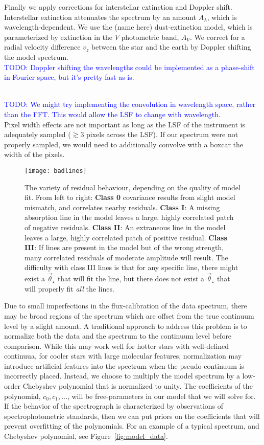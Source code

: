 \documentclass[preprint]{aastex} %
\newcommand{\vt}{\vec{\theta}}
\newcommand{\vstar}{\vt_{\star}}
\newcommand{\todo}[1]{ \textcolor{Blue}{\\TODO: #1}}
\begin{document}
Finally we apply corrections for interstellar extinction and Doppler shift. Interstellar extinction attenuates the spectrum by an amount $A_\lambda$, which is wavelength-dependent. We use the (name here) dust-extinction model, which is parameterized by extinction in the $V$ photometric band, $A_V$. We correct for a radial velocity difference $v_z$ between the star and the earth by Doppler shifting the model spectrum. 
\todo{Doppler shifting the wavelengths could be implemented as a phase-shift in Fourier space, but it's pretty fast as-is.}

\todo{We might try implementing the convolution in wavelength space, rather than the FFT. This would allow the LSF to change with wavelength.\\}
Pixel width effects are not important as long as the LSF of the instrument is adequately sampled ($\gtrsim 3$ pixels across the LSF). If our spectrum were not properly sampled, we would need to additionally convolve with a boxcar the width of the pixels.

\begin{figure*}[!htb]
\begin{center}
  \texttt{[image: badlines]}
  \caption{The variety of residual behaviour, depending on the quality of model fit. From left to right: \textbf{Class 0} covariance results from slight model mismatch, and correlates nearby residuals. \textbf{Class I}: A missing absorption line in the model leaves a large, highly correlated patch of negative residuals. \textbf{Class II}: An extraneous line in the model leaves a large, highly correlated patch of positive residual. \textbf{Class III}: If lines are present in the model but of the wrong strength, many correlated residuals of moderate amplitude will result. The difficulty with class III lines is that for any specific line, there might exist a $\vstar$ that will fit the line, but there does not exist a $\vstar$ that will properly fit \emph{all} the lines.}
\label{fig:badlines}
\end{center}
\end{figure*}

Due to small imperfections in the flux-calibration of the data spectrum, there may be broad regions of the spectrum which are offset from the true continuum level by a slight amount. A traditional approach to address this problem is to normalize both the data and the spectrum to the continuum level before comparison. While this may work well for hotter stars with well-defined continuua, for cooler stars with large molecular features, normalization may introduce artificial features into the spectrum when the pseudo-continuum is incorrectly placed. Instead, we choose to multiply the model spectrum by a low-order Chebyshev polynomial that is normalized to unity. The coefficients of the polynomial, $c_0, c_1, \ldots$, will be free-parameters in our model that we will solve for. If the behavior of the spectrograph is characterized by observations of spectrophotometric standards, then we can put priors on the coefficients that will prevent overfitting of the polynomials. For an example of a typical spectrum, and Chebyshev polynomial, see Figure~\ref{fig:model_data}.
\end{document}
